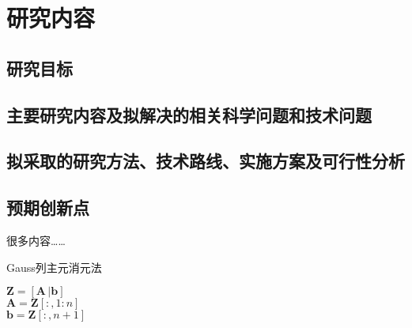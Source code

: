 \section{研究内容}\label{sec:researchContent}

\subsection{研究目标}

\subsection{主要研究内容及拟解决的相关科学问题和技术问题}
	
\subsection{拟采取的研究方法、技术路线、实施方案及可行性分析}

\subsection{预期创新点}

很多内容……

\begin{algorithm}[H]
    \caption{Gauss列主元消元法}
    \label{alg:GaussElim}
    $\boldsymbol{Z} = [\boldsymbol{A}\,| \boldsymbol{b}]$\\
    $\boldsymbol{A} = \boldsymbol{Z}[:,1:n]$\\
    $\boldsymbol{b} = \boldsymbol{Z}[:,n+1]$\\
\end{algorithm}
